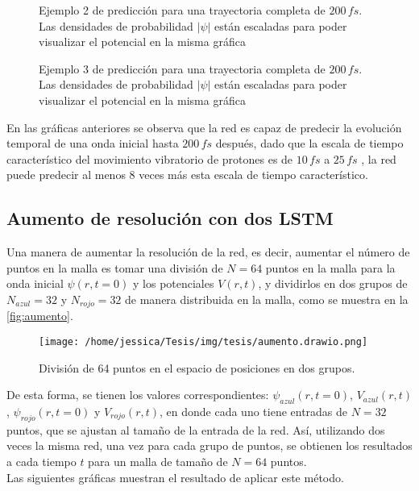 \begin{figure}[H]
  \centering
  \caption{Ejemplo 2 de predicción para una trayectoria completa de $200\,fs$.\\ Las densidades de probabilidad $|\psi|$ están escaladas para poder visualizar el potencial en la misma gráfica}
  \label{fig:trajec2}
\end{figure}

\begin{figure}[H]
  \centering
  \caption{Ejemplo 3 de predicción para una trayectoria completa de $200\,fs$.\\ Las densidades de probabilidad $|\psi|$ están escaladas para poder visualizar el potencial en la misma gráfica}
  \label{fig:trajec3}
\end{figure}

En las gráficas anteriores se observa que la red es capaz de predecir la evolución temporal de una onda inicial hasta $200\,fs$ después, dado que la escala de tiempo característico del movimiento vibratorio de protones es de $10\,fs$ a $25\,fs$ \cite{Main:2021}, la red puede predecir al menos 8 veces más esta escala de tiempo característico.  


\subsection{Aumento de resolución con dos LSTM}

Una manera de aumentar la resolución de la red, es decir, aumentar el número de puntos en la malla es tomar una división de $N=64$ puntos en la malla para la onda inicial $\psi(r,t=0)$ y los potenciales $V(r,t)$, y dividirlos en dos grupos de $N_{azul}=32$ y $N_{rojo}=32$ de manera distribuida en la malla, como se muestra en la \autoref{fig:aumento}. 

\begin{figure}[H]
  \centering
  \texttt{[image: /home/jessica/Tesis/img/tesis/aumento.drawio.png]}
  \caption{División de 64 puntos en el espacio de posiciones en dos grupos.}
  \label{fig:aumento}
\end{figure}

De esta forma, se tienen los valores correspondientes: $\psi_{azul}(r,t=0)$, $V_{azul}(r,t)$, $\psi_{rojo}(r,t=0)$ y $V_{rojo}(r,t)$, en donde cada uno tiene entradas de $N=32$ puntos, que se ajustan al tamaño de la entrada de la red. Así, utilizando dos veces la misma red, una vez para cada grupo de puntos, se obtienen los resultados a cada tiempo $t$ para un malla de tamaño de $N=64$ puntos.
\\
Las siguientes gráficas muestran el resultado de aplicar este método.

